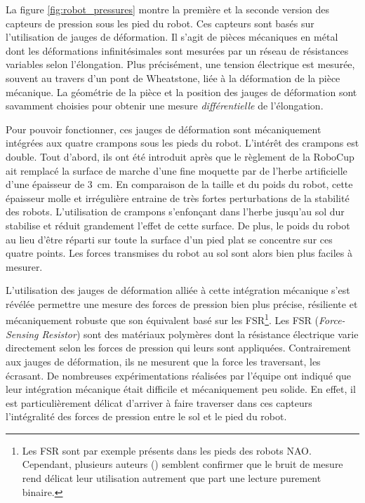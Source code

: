 La figure \ref{fig:robot_pressures} montre la première et la seconde version
des capteurs de pression sous les pied du robot.
Ces capteurs sont basés sur l'utilisation de jauges de déformation.
Il s'agit de pièces mécaniques en métal dont les déformations infinitésimales
sont mesurées par un réseau de résistances variables selon l'élongation.
Plus précisément, une tension électrique est mesurée, souvent au travers
d'un pont de Wheatstone, liée à la déformation de la pièce mécanique.
La géométrie de la pièce et la position des jauges de déformation sont 
savamment choisies pour obtenir une mesure \textit{différentielle} de l'élongation.

Pour pouvoir fonctionner, ces jauges de déformation sont mécaniquement
intégrées aux quatre crampons sous les pieds du robot.
L'intérêt des crampons est double.
Tout d'abord, ils ont été introduit après que le règlement 
de la RoboCup ait remplacé la surface de marche d'une fine moquette par 
de l'herbe artificielle d'une épaisseur de $3$~cm.
En comparaison de la taille et du poids du robot, cette épaisseur molle
et irrégulière entraine de très fortes perturbations de la stabilité des robots.
L'utilisation de crampons s'enfonçant dans l'herbe jusqu'au sol dur stabilise
et réduit grandement l'effet de cette surface.
De plus, le poids du robot au lieu d'être réparti sur toute
la surface d'un pied plat se concentre sur ces quatre points.
Les forces transmises du robot au sol sont alors bien plus faciles
à mesurer.

L'utilisation des jauges de déformation alliée à cette intégration mécanique 
s'est révélée permettre une mesure des forces de pression
bien plus précise, résiliente et mécaniquement robuste que son équivalent 
basé sur les FSR\footnote{Les FSR sont par exemple présents dans les pieds 
des robots NAO. Cependant, plusieurs auteurs (\cite{alcaraz-jimenez_robust_2013}) 
semblent confirmer que le bruit
de mesure rend délicat leur utilisation autrement que part une lecture purement binaire.}.
Les FSR (\textit{Force-Sensing Resistor}) sont des matériaux polymères dont
la résistance électrique varie directement selon les forces de pression 
qui leurs sont appliquées.
Contrairement aux jauges de déformation, ils ne mesurent 
que la force les traversant, les écrasant.
De nombreuses expérimentations réalisées par l'équipe ont indiqué que 
leur intégration mécanique était difficile et mécaniquement peu solide.
En effet, il est particulièrement délicat d'arriver à faire traverser 
dans ces capteurs l'intégralité des forces de pression entre le sol 
et le pied du robot.

